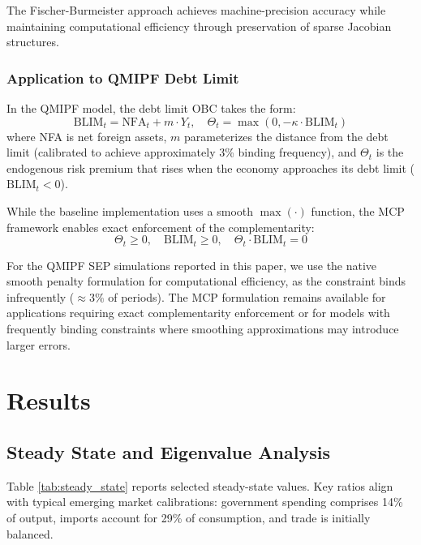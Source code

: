 \documentclass[12pt]{article}
\begin{document}
The Fischer-Burmeister approach achieves machine-precision accuracy while maintaining computational efficiency through preservation of sparse Jacobian structures.

\subsubsection{Application to QMIPF Debt Limit}

In the QMIPF model, the debt limit OBC takes the form:
\[
\text{BLIM}_t = \text{NFA}_t + m \cdot Y_t, \quad \Theta_t = \max(0, -\kappa \cdot \text{BLIM}_t)
\]
where NFA is net foreign assets, $m$ parameterizes the distance from the debt limit (calibrated to achieve approximately 3\% binding frequency), and $\Theta_t$ is the endogenous risk premium that rises when the economy approaches its debt limit ($\text{BLIM}_t < 0$).

While the baseline implementation uses a smooth $\max(\cdot)$ function, the MCP framework enables exact enforcement of the complementarity:
\[
\Theta_t \geq 0, \quad \text{BLIM}_t \geq 0, \quad \Theta_t \cdot \text{BLIM}_t = 0
\]

For the QMIPF SEP simulations reported in this paper, we use the native smooth penalty formulation for computational efficiency, as the constraint binds infrequently ($\approx 3\%$ of periods). The MCP formulation remains available for applications requiring exact complementarity enforcement or for models with frequently binding constraints where smoothing approximations may introduce larger errors.

\section{Results}\label{sec:results}

\subsection{Steady State and Eigenvalue Analysis}

Table \ref{tab:steady_state} reports selected steady-state values. Key ratios align with typical emerging market calibrations: government spending comprises 14\% of output, imports account for 29\% of consumption, and trade is initially balanced.
\end{document}
